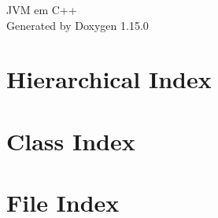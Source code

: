 \documentclass[twoside]{book}
\newcommand{\+}{\discretionary{\mbox{\scriptsize$\hookleftarrow$}}{}{}}
\newcommand{\clearemptydoublepage}{%
    \newpage{\pagestyle{empty}\cleardoublepage}%
  }
\begin{document}
  \raggedbottom
    \hypersetup{pageanchor=false,
                bookmarksnumbered=true,
                pdfencoding=unicode
               }
  \begin{titlepage}
  \vspace*{7cm}
  \begin{center}%
  {\Large JVM em C++}\\
  \vspace*{1cm}
  {\large Generated by Doxygen 1.15.0}\\
  \end{center}
  \end{titlepage}
  \clearemptydoublepage
  \tableofcontents
  \clearemptydoublepage
  \hypersetup{pageanchor=true}

\chapter{Hierarchical Index}

\chapter{Class Index}

\chapter{File Index}

\end{document}
